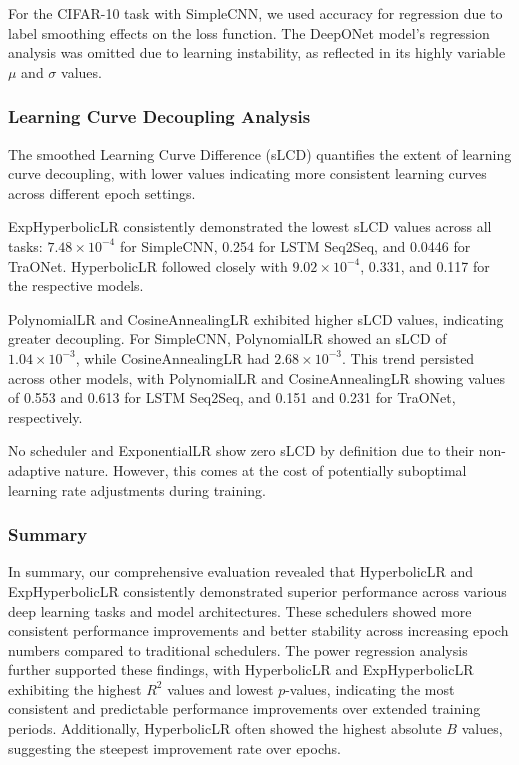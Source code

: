 \documentclass{article}
\theoremstyle{plain}
\theoremstyle{definition}
\theoremstyle{remark}
\begin{document}
For the CIFAR-10 task with SimpleCNN, we used accuracy for regression due to label smoothing effects on the loss function. The DeepONet model's regression analysis was omitted due to learning instability, as reflected in its highly variable $\mu$ and $\sigma$ values.

\subsubsection{Learning Curve Decoupling Analysis}
\label{subsubsec:learning_curve_decoupling}

The smoothed Learning Curve Difference (sLCD) quantifies the extent of learning curve decoupling, with lower values indicating more consistent learning curves across different epoch settings.

ExpHyperbolicLR consistently demonstrated the lowest sLCD values across all tasks: $7.48 \times 10^{-4}$ for SimpleCNN, 0.254 for LSTM Seq2Seq, and 0.0446 for TraONet. HyperbolicLR followed closely with $9.02 \times 10^{-4}$, 0.331, and 0.117 for the respective models. 

PolynomialLR and CosineAnnealingLR exhibited higher sLCD values, indicating greater decoupling. For SimpleCNN, PolynomialLR showed an sLCD of $1.04 \times 10^{-3}$, while CosineAnnealingLR had $2.68 \times 10^{-3}$. This trend persisted across other models, with PolynomialLR and CosineAnnealingLR showing values of 0.553 and 0.613 for LSTM Seq2Seq, and 0.151 and 0.231 for TraONet, respectively.

No scheduler and ExponentialLR show zero sLCD by definition due to their non-adaptive nature. However, this comes at the cost of potentially suboptimal learning rate adjustments during training.

\subsubsection{Summary}
\label{subsubsec:summary}

In summary, our comprehensive evaluation revealed that HyperbolicLR and ExpHyperbolicLR consistently demonstrated superior performance across various deep learning tasks and model architectures.
These schedulers showed more consistent performance improvements and better stability across increasing epoch numbers compared to traditional schedulers.
The power regression analysis further supported these findings, with HyperbolicLR and ExpHyperbolicLR exhibiting the highest $R^2$ values and lowest $p$-values, indicating the most consistent and predictable performance improvements over extended training periods.
Additionally, HyperbolicLR often showed the highest absolute $B$ values, suggesting the steepest improvement rate over epochs.
\end{document}
